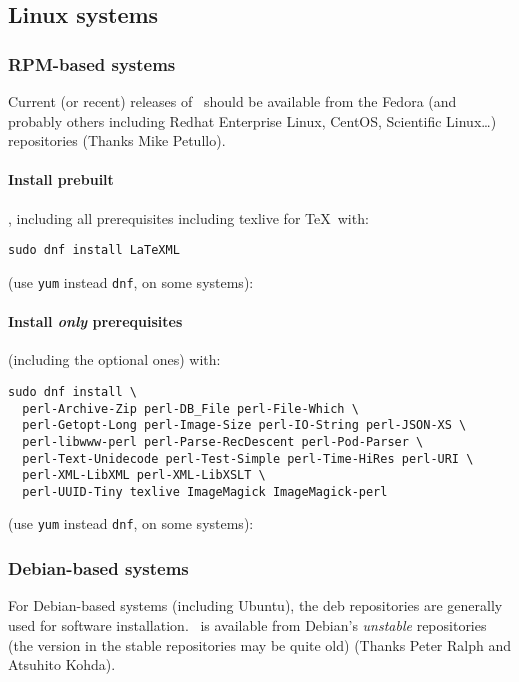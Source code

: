 \documentclass{article}
\begin{document}
\subsection{Linux systems}\label{get.linux}
\subsubsection[RPM-based systems]{RPM-based systems}\label{get.linux.rpm}
Current (or recent) releases of \LaTeXML\ should be available from
the Fedora (and probably others including Redhat Enterprise Linux, CentOS, Scientific Linux\ldots)
repositories (Thanks Mike Petullo).

\paragraph*{Install prebuilt} \LaTeXML, including all prerequisites including texlive for \TeX\ with:
\begin{lstlisting}[style=shell]
sudo dnf install LaTeXML
\end{lstlisting}
(use \texttt{yum} instead \texttt{dnf}, on some systems):

\paragraph*{Install \emph{only} prerequisites}\label{get.linux.rpm.prereq}
(including the optional ones) with:
\begin{lstlisting}[style=shell]
sudo dnf install \
  perl-Archive-Zip perl-DB_File perl-File-Which \
  perl-Getopt-Long perl-Image-Size perl-IO-String perl-JSON-XS \
  perl-libwww-perl perl-Parse-RecDescent perl-Pod-Parser \
  perl-Text-Unidecode perl-Test-Simple perl-Time-HiRes perl-URI \
  perl-XML-LibXML perl-XML-LibXSLT \
  perl-UUID-Tiny texlive ImageMagick ImageMagick-perl
\end{lstlisting}
(use \texttt{yum} instead \texttt{dnf}, on some systems):

\subsubsection{Debian-based systems}\label{get.linux.debian}
For Debian-based systems (including Ubuntu), the deb repositories
are generally used for software installation.
\LaTeXML\ is available from Debian's \emph{unstable} repositories
(the version in the stable repositories may be quite old)
(Thanks Peter Ralph and Atsuhito Kohda).
\end{document}
